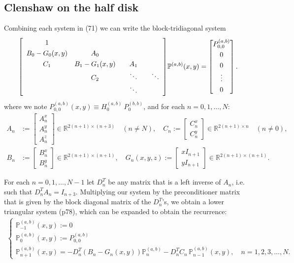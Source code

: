 \documentclass[11pt, oneside]{article}   	%
\newcommand{\R}{\mathbb{R}}
\newcommand{\bigP}{\mathbb{P}}
\newcommand{\bigPab}{\bigP^{(a,b)}}
\newcommand{\Dnt}{D^T_n}
\begin{document}
\subsection{Clenshaw on the half disk}

Combining each system in (71) we can write the block-tridiagonal system
\begin{align}
\renewcommand\arraystretch{1.3}
\mleft[
\begin{array}{cccc}
		1 & & & \\
		B_0-G_0(x,y) & A_0 & & \\
		C_1 & B_1-G_1(x,y) & \quad A_1 \quad & \\
		& C_2 & \ddots & \ddots \\
		& & \ddots &
\end{array}
\mright]
\bigPab(x,y)
=
\begin{bmatrix}
	P^{(a,b)}_{0,0} \\ 0 \\ 0 \\ \vdots \\ 0 \\
\end{bmatrix}.
\end{align}
where we note \(P^{(a,b)}_{0,0}(x,y) \equiv H_0^{(a,b)} \: P_0^{(b,b)}\), and for each \(n = 0,1,\dots,N\):
\begin{align}
A_n &:= \begin{bmatrix}
		A^x_n \\
		A^y_n \\
		A^z_n
	    \end{bmatrix} \in \R^{2(n+1)\times(n+3)} \quad (n \ne N), \quad
C_n := \begin{bmatrix}
		C^x_n \\
		C^y_n
	    \end{bmatrix} \in \R^{2(n+1)\times n} \quad (n \ne 0), \nonumber \\
B_n &:= \begin{bmatrix}
		B^x_n \\
		B^y_n
	    \end{bmatrix} \in \R^{2(n+1)\times(n+1)}, \quad
G_n(x,y,z) := \begin{bmatrix}
		xI_{n+1} \\
		yI_{n+1}
	    \end{bmatrix} \in \R^{2(n+1)\times(n+1)}.
\end{align}
 
For each \(n = 0,1,\dots,N-1\) let \(\Dnt\) be any matrix that is a left inverse of \(A_n\), i.e. such that \(\Dnt A_n = I_{n+3}\). Multiplying our system by the preconditioner matrix that is given by the block diagonal matrix of the \(\Dnt\)'s, we obtain a lower triangular system \citep{dunkl2014orthogonal} (p78), which can be expanded to obtain the recurrence:
\begin{align}
\begin{cases}
\bigPab_{-1}(x,y) := 0 \\
\bigPab_{0}(x,y) := P^{(a,b)}_{0,0} \\
\bigPab_{n+1}(x,y) = -\Dnt (B_n-G_n(x,y)) \bigPab_n - \Dnt C_n  \,\bigPab_{n-1}(x,y), \quad n = 1,2,3,\dots,N.
\end{cases}
\end{align}
\end{document}
